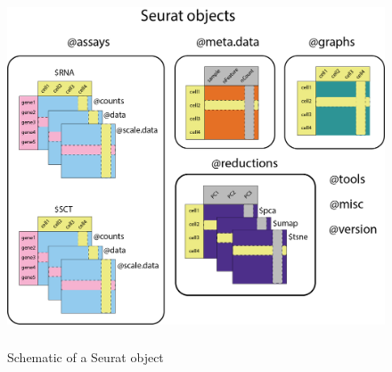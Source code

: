 \documentclass[
  letterpaper,
  DIV=11,
  numbers=noendperiod]{scrreprt}
\begin{document}
\begin{figure}[H]

{\centering \includegraphics[width=4.89583in,height=4.16667in]{image/seurat_object.png}

}

\caption{Schematic of a Seurat object}

\end{figure}%
\end{document}

